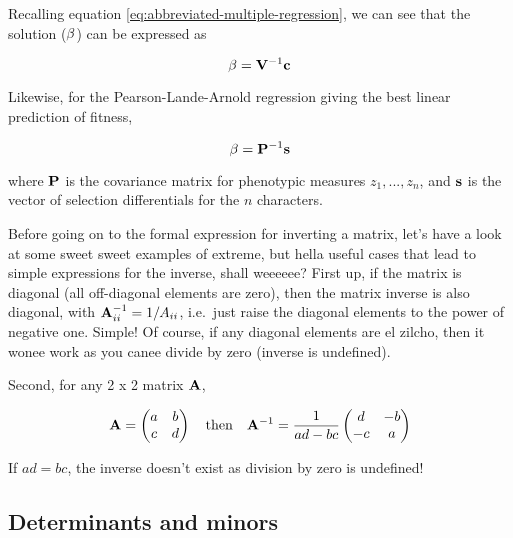 \documentclass[
]{book}
\begin{document}
Recalling equation \eqref{eq:abbreviated-multiple-regression}, we can see that the solution (\(\mathbf{\beta}\)) can be expressed as

\begin{equation}
    \mathbf{\beta} = \mathbf{V}^{-1}\mathbf{c}
    \label{eq:beta-multiple-regression}
\end{equation}

Likewise, for the Pearson-Lande-Arnold regression giving the best linear prediction of fitness,

\begin{equation}
    \mathbf{\beta} = \mathbf{P}^{-1}\mathbf{s}
    \label{eq:beta-pearson-lande-arnold-regression}
\end{equation}

where \(\mathbf{P}\) is the covariance matrix for phenotypic measures \(z_1, ..., z_n\), and \(\mathbf{s}\) is the vector of selection differentials for the \(n\) characters.

Before going on to the formal expression for inverting a matrix, let's have a look at some sweet sweet examples of extreme, but hella useful cases that lead to simple expressions for the inverse, shall weeeeee? First up, if the matrix is diagonal (all off-diagonal elements are zero), then the matrix inverse is also diagonal, with \(\mathbf{A}^{-1}_{ii} = 1/A_{ii}\), i.e.~just raise the diagonal elements to the power of negative one. Simple! Of course, if any diagonal elements are el zilcho, then it wonee work as you canee divide by zero (inverse is undefined).

Second, for any 2 x 2 matrix \(\mathbf{A}\),

\begin{equation}
    \mx{A} = 
    \begin{pmatrix}
        a & b \\
        c & d
    \end{pmatrix}
    \ \ \ \mathrm{then}\ \ \ 
    \mx{A}^{-1}
    = 
    \frac{1} {ad - bc}
    \begin{pmatrix}
        d & -b \\
        -c & a
    \end{pmatrix}
    \label{eq:inverse-of-twobytwo-matrix}
\end{equation}

If \(ad = bc\), the inverse doesn't exist as division by zero is undefined!

\hypertarget{determinants-and-minors}{%
\subsection{Determinants and minors}\label{determinants-and-minors}}
\end{document}
